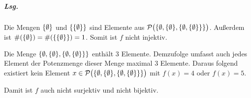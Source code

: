 \documentclass{scrreprt}
\begin{document}
\begin{enumerate}[(a)]
  \subparagraph{Lsg.}
  Die Mengen $\qty{\emptyset}$ und $\qty{\qty{\emptyset}}$ sind Elemente aus
  $\mathcal{P}\qty\big(\qty{\emptyset, \qty{\emptyset}, \qty{\emptyset,
      \qty{\emptyset}}})$.
  Außerdem ist $\#(\qty{\emptyset}) = \#(\qty{\qty{\emptyset}}) = 1$.
  Somit ist $f$ nicht injektiv.

  Die Menge $\qty{\emptyset, \qty{\emptyset}, \qty{\emptyset, \qty{\emptyset}}}$
  enthält $3$ Elemente.
  Demzufolge umfasst auch jedes Element der Potenzmenge dieser Menge maximal $3$
  Elemente.
  Daraus folgend existiert kein Element
  $x \in \mathcal{P}\qty\big(\qty{\emptyset, \qty{\emptyset}, \qty{\emptyset,
      \qty{\emptyset}}})$ mit $f(x) = 4$ oder $f(x) = 5$.

  Damit ist $f$ auch nicht surjektiv und nicht bijektiv.
\end{enumerate}
\end{document}
